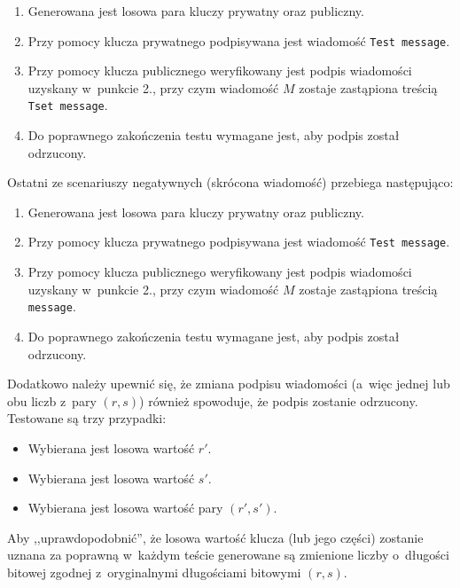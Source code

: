 \documentclass{article}
\begin{document}
        \begin{enumerate}
            \item Generowana jest losowa para kluczy prywatny oraz publiczny.
            \item Przy pomocy klucza prywatnego podpisywana jest wiadomość \verb+Test message+.
            \item Przy pomocy klucza publicznego weryfikowany jest podpis wiadomości uzyskany w~punkcie 2., przy czym wiadomość $M$ zostaje zastąpiona treścią \verb+Tset message+.
            \item Do poprawnego zakończenia testu wymagane jest, aby podpis został odrzucony.
        \end{enumerate}        
        
        Ostatni ze scenariuszy negatywnych (skrócona wiadomość) przebiega następująco:
        
        \begin{enumerate}
            \item Generowana jest losowa para kluczy prywatny oraz publiczny.
            \item Przy pomocy klucza prywatnego podpisywana jest wiadomość \verb+Test message+.
            \item Przy pomocy klucza publicznego weryfikowany jest podpis wiadomości uzyskany w~punkcie 2., przy czym wiadomość $M$ zostaje zastąpiona treścią \verb+message+.
            \item Do poprawnego zakończenia testu wymagane jest, aby podpis został odrzucony.
        \end{enumerate}
        
        Dodatkowo należy upewnić się, że zmiana podpisu wiadomości (a~więc jednej lub obu liczb z~pary $(r, s)$) również spowoduje, że podpis zostanie odrzucony. Testowane są trzy przypadki:
        
        \begin{itemize}
            \item Wybierana jest losowa wartość $r'$.
            \item Wybierana jest losowa wartość $s'$.
            \item Wybierana jest losowa wartość pary $(r', s')$.
        \end{itemize}

        \noindent Aby ,,uprawdopodobnić'', że losowa wartość klucza (lub jego części) zostanie uznana za poprawną w~każdym teście generowane są zmienione liczby o~długości bitowej zgodnej z~oryginalnymi długościami bitowymi $(r, s)$.
\end{document}
